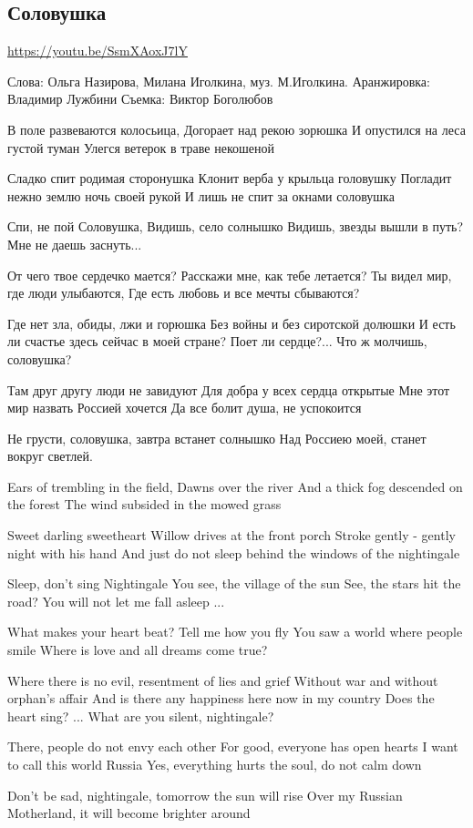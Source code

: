  
 
 
 
 
\subsection{Соловушка}
\label{sec:songs.deti.solovushka}

\url{https://youtu.be/SsmXAoxJ7lY}

Слова: Ольга Назирова, Милана Иголкина, муз. М.Иголкина. 
Аранжировка: Владимир Лужбини
Съемка: Виктор Боголюбов

В поле развеваются колосьица, 
Догорает над рекою зорюшка 
И опустился на леса густой туман 
Улегся ветерок в траве некошеной 

Сладко спит родимая сторонушка 
Клонит верба у крыльца головушку 
Погладит нежно землю ночь своей рукой 
И лишь не спит за окнами соловушка

Спи, не пой Соловушка, 
Видишь, село солнышко 
Видишь, звезды вышли в путь? 
Мне не даешь заснуть... 

От чего твое сердечко мается? 
Расскажи мне, как тебе летается? 
Ты видел мир, где люди улыбаются, 
Где есть любовь и все мечты сбываются? 

Где нет зла, обиды, лжи и горюшка 
Без войны и без сиротской долюшки 
И есть ли счастье здесь сейчас в моей стране?
Поет ли сердце?... Что ж молчишь, соловушка? 

Там друг другу люди не завидуют 
Для добра у всех сердца открытые 
Мне этот мир назвать Россией хочется 
Да все болит душа, не успокоится 

Не грусти, соловушка, завтра встанет солнышко 
Над Россиею моей, станет вокруг светлей.

Ears of trembling in the field,
Dawns over the river
And a thick fog descended on the forest
The wind subsided in the mowed grass

Sweet darling sweetheart
Willow drives at the front porch
Stroke gently - gently night with his hand
And just do not sleep behind the windows of the nightingale

Sleep, don't sing Nightingale
You see, the village of the sun
See, the stars hit the road?
You will not let me fall asleep ...

What makes your heart beat?
Tell me how you fly
You saw a world where people smile
Where is love and all dreams come true?

Where there is no evil, resentment of lies and grief
Without war and without orphan’s affair
And is there any happiness here now in my country
Does the heart sing? ...
What are you silent, nightingale?

There, people do not envy each other
For good, everyone has open hearts
I want to call this world Russia
Yes, everything hurts the soul, do not calm down

Don’t be sad, nightingale, tomorrow the sun will rise
Over my Russian Motherland, it will become brighter around
